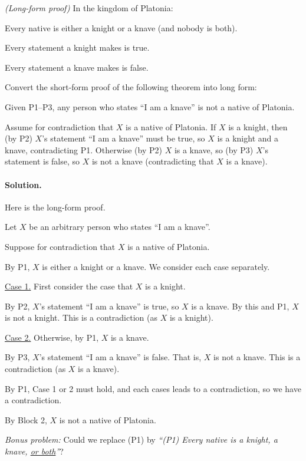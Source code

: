 \exercise \emph{(Long-form proof)} In the kingdom of Platonia:
\begin{mylist}
\item[(P1)] Every native is either a knight or a knave (and nobody is both).
\item[(P2)] Every statement a knight makes is true.
\item[(P3)] Every statement a knave makes is false.
\end{mylist}

Convert the short-form proof of the following theorem into long form:
\begin{theorem}
  Given P1--P3, any person who states ``I am a knave'' is not a native of Platonia.
\end{theorem}
\begin{shortFormProof}
  Assume for contradiction that $X$ is a native of Platonia.
  If $X$ is a knight, then (by P2) $X$'s statement ``I am a knave''
  must be true, so $X$ is a knight and a knave, contradicting P1.
  Otherwise (by P2) $X$ is a knave, so (by P3)
  $X$'s statement is false, so $X$ is not a knave
  (contradicting that $X$ is a knave).
\end{shortFormProof}

\paragraph{Solution.}  Here is the long-form proof.
\begin{longFormProof}
  \step Let $X$ be an arbitrary person who states ``I am a knave''.
  \begin{block}\label{proofs: block: knave}
    \step Suppose for contradiction that $X$ is a native of Platonia.

    \step By P1, $X$ is either a knight or a knave.
      We consider each case separately.
    \begin{block}
      \step \underline{Case 1.}  First consider the case that $X$ is a knight.

      \step By P2, $X$'s statement ``I am a knave'' is true,  so $X$ is a knave.
      \step By this and P1, $X$ is not a knight.
      \step This is a contradiction (as $X$ is a knight).
    \end{block}
    \begin{block}
      \step \underline{Case 2.}  Otherwise, by P1,  $X$ is a knave.

      \step By P3, $X$'s statement ``I am a knave'' is false.
      \step That is, $X$ is not a knave.
      \step This is a contradiction (as $X$ is a knave).
    \end{block}
    \step By P1, Case 1 or 2 must hold, and each cases leads to a contradiction, so we have a contradiction.
  \end{block}
  \step By Block 2, $X$ is not a native of Platonia. \vspace*{-1ex}
\end{longFormProof}
\vspace*{-1ex}
\emph{Bonus problem:} Could we replace (P1) by  \emph{``(P1) Every native is a knight, a knave, \underline{or both}''}?


